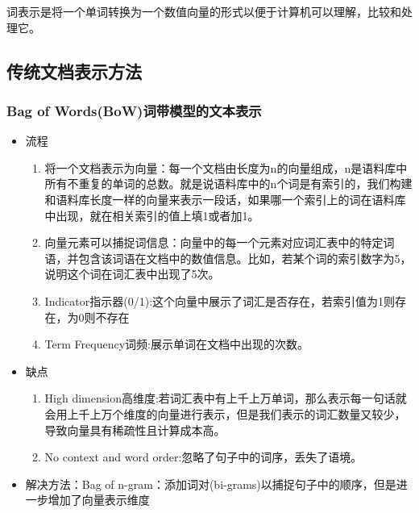 \documentclass[UTF8]{ctexart}
\begin{document}
词表示是将一个单词转换为一个数值向量的形式以便于计算机可以理解，比较和处理它。

\subsection{传统文档表示方法}
\subsubsection{Bag of Words(BoW)词带模型的文本表示}
\begin{itemize}
    \item 流程
    \begin{enumerate}
        \item 将一个文档表示为向量：每一个文档由长度为n的向量组成，n是语料库中所有不重复的单词的总数。就是说语料库中的n个词是有索引的，我们构建和语料库长度一样的向量来表示一段话，如果哪一个索引上的词在语料库中出现，就在相关索引的值上填1或者加1。
        \item 向量元素可以捕捉词信息：向量中的每一个元素对应词汇表中的特定词语，并包含该词语在文档中的数值信息。比如，若某个词的索引数字为5，说明这个词在词汇表中出现了5次。
        \item Indicator指示器(0/1):这个向量中展示了词汇是否存在，若索引值为1则存在，为0则不存在
        \item Term Frequency词频:展示单词在文档中出现的次数。
    \end{enumerate}
    \item 缺点
    \begin{enumerate}
        \item High dimension高维度:若词汇表中有上千上万单词，那么表示每一句话就会用上千上万个维度的向量进行表示，但是我们表示的词汇数量又较少，导致向量具有稀疏性且计算成本高。
        \item No context and word order:忽略了句子中的词序，丢失了语境。
    \end{enumerate}
    \item 解决方法：Bag of n-gram：添加词对(bi-grams)以捕捉句子中的顺序，但是进一步增加了向量表示维度
\end{itemize}
\end{document}
